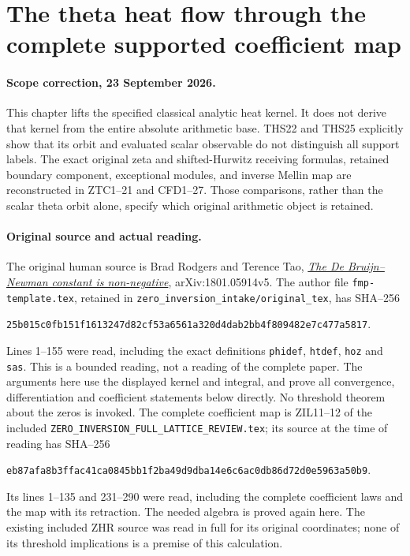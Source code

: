\section{The theta heat flow through the complete supported coefficient map}
\label{sec:theta-heat-full-support}

\paragraph{Scope correction, 23 September 2026.}
This chapter lifts the specified classical analytic heat kernel. It does
not derive that kernel from the entire absolute arithmetic base.
THS22 and THS25 explicitly show that its orbit and evaluated scalar
observable do not distinguish all support labels. The exact original
zeta and shifted-Hurwitz receiving formulas, retained boundary component,
exceptional modules, and inverse Mellin map are reconstructed in
ZTC1--21 and CFD1--27. Those comparisons, rather than the scalar
theta orbit alone, specify which original arithmetic object is retained.

\paragraph{Original source and actual reading.}
The original human source is Brad Rodgers and Terence Tao,
\href{https://arxiv.org/abs/1801.05914v5}{\emph{The De Bruijn--Newman
constant is non-negative}}, arXiv:1801.05914v5. The author file
\texttt{fmp-template.tex}, retained in
\texttt{zero\_inversion\_intake/original\_tex}, has SHA--256
\begin{center}\small
\texttt{25b015c0fb151f1613247d82cf53a6561a320d4dab2bb4f809482e7c477a5817}.
\end{center}
Lines 1--155 were read, including the exact definitions
\texttt{phidef}, \texttt{htdef}, \texttt{hoz} and \texttt{sas}.
This is a bounded reading, not a reading of the complete paper.
The arguments here use the displayed kernel and integral, and prove
all convergence, differentiation and coefficient statements below
directly. No threshold theorem about the zeros is invoked.
The complete coefficient map is ZIL11--12 of the included
\texttt{ZERO\_INVERSION\_FULL\_LATTICE\_REVIEW.tex}; its source at
the time of reading has SHA--256
\begin{center}\small
\texttt{eb87afa8b3ffac41ca0845bb1f2ba49d9dba14e6c6ac0db86d72d0e5963a50b9}.
\end{center}
Its lines 1--135 and 231--290 were read, including the complete
coefficient laws and the map with its retraction. The needed algebra
is proved again here. The existing included ZHR source was read in
full for its original coordinates; none of its threshold implications
is a premise of this calculation.

